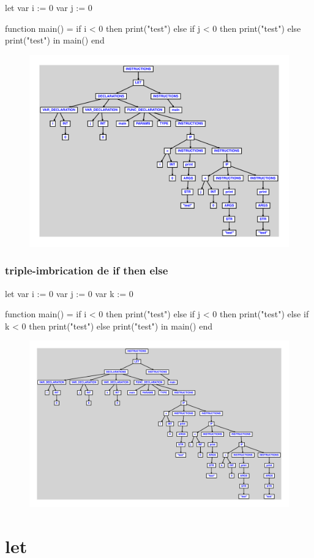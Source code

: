 \documentclass{article}
\begin{document}
\begin{verbatimtab}
let
	var i := 0
	var j := 0

	function main() =
		if i < 0 then
			print("test")
		else
			if j < 0 then
				print("test")
			else
				print("test")
in main() end
\end{verbatimtab}
\begin{figure}[H]\centering\includegraphics[max width=\textwidth]{ast/ast_256.pdf}\end{figure}\subsubsection{triple-imbrication de if then else}
\begin{verbatimtab}
let
	var i := 0
	var j := 0
	var k := 0

	function main() =
		if i < 0 then
			print("test")
		else
			if j < 0 then
				print("test")
			else
				if k < 0 then
					print("test")
				else
					print("test")
in main() end
\end{verbatimtab}
\begin{figure}[H]\centering\includegraphics[max width=\textwidth]{ast/ast_257.pdf}\end{figure}\section{let}
\end{document}
